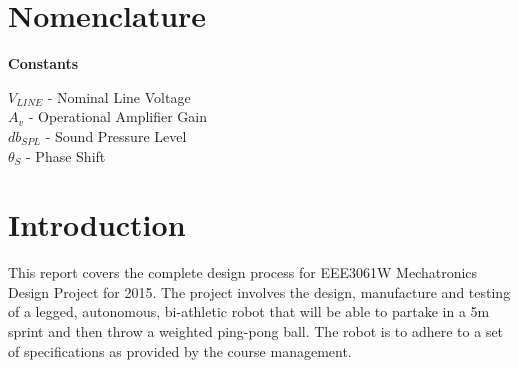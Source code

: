%
%
%

\section*{Nomenclature}
\label{sec:Nomenclature}

\textbf{Constants}

\(V_{LINE}\) - Nominal Line Voltage\\
\(A_v\) - Operational Amplifier Gain\\
\(db_{SPL}\) - Sound Pressure Level\\
\(\theta_S\) - Phase Shift

\mainmatter
\section{Introduction}
\label{sec:Introduction}
  This report covers the complete design process for EEE3061W Mechatronics Design Project for 2015.  The project involves the design, manufacture and testing of a legged, autonomous, bi-athletic robot that will be able to partake in a 5m sprint and then throw a weighted ping-pong ball.  The robot is to adhere to a set of specifications as provided by the course management. \\


